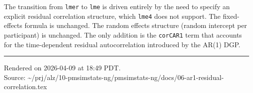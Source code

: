 \documentclass[11pt]{article}
\begin{document}
The transition from \texttt{lmer} to \texttt{lme} is driven
entirely by the need to specify an explicit residual
correlation structure, which \texttt{lme4} does not support.
The fixed-effects formula is unchanged. The random effects
structure (random intercept per participant) is unchanged.
The only addition is the \texttt{corCAR1} term that accounts
for the time-dependent residual autocorrelation introduced by
the AR(1) DGP.

\vfill
\noindent\rule{\textwidth}{0.4pt}
{\footnotesize
Rendered on 2026-04-09 at 18:49 PDT.\\
Source: \textasciitilde/prj/alz/10-pmsimstats-ng/pmsimstats-ng/docs/06-ar1-residual-correlation.tex}
\end{document}
